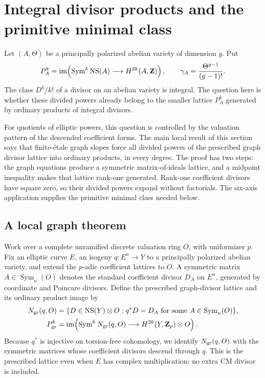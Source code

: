 \section{Integral divisor products and the primitive minimal class}
\label{sec:minimal-class}

Let \((A,\Theta)\) be a principally polarized abelian variety of dimension
\(g\).  Put
\[
 P_A^k=\operatorname{im}\!\left(
 \operatorname{Sym}^k\operatorname{NS}(A)\longrightarrow H^{2k}(A,\mathbf Z)
 \right),
 \qquad
 \gamma_A=\frac{\Theta^{g-1}}{(g-1)!}.
\]
The class \(D^k/k!\) of a divisor on an abelian variety is integral.  The
question here is whether these divided powers already belong to the smaller
lattice \(P_A^k\) generated by ordinary products of integral divisors.

For quotients of elliptic powers, this question is controlled by the
valuation pattern of the descended coefficient forms.  The main local result
of this section says that finite-\'etale graph slopes force all divided powers
of the prescribed graph divisor lattice into ordinary products, in every
degree.  The proof has two steps: the graph equations produce a symmetric
matrix-of-ideals lattice, and a midpoint inequality makes that lattice
rank-one generated.  Rank-one coefficient divisors have square zero, so their
divided powers expand without factorials.  The six-axis application supplies
the primitive minimal class needed below.

\subsection{A local graph theorem}

Work over a complete unramified discrete valuation ring \(O\), with
uniformizer \(p\).  Fix an elliptic curve \(E\), an isogeny
\(q:E^n\to Y\) to a principally polarized abelian variety, and extend the
\(p\)-adic coefficient lattices to \(O\).  A symmetric matrix
\(A\in\operatorname{Sym}_n(O)\) denotes the standard coefficient divisor
\(D_A\) on \(E^n\), generated by coordinate and Poincare divisors.  Define
the prescribed graph-divisor lattice and its ordinary product image by
\[
 \begin{aligned}
 N_{\rm gr}(q,O)
 &=\{D\in\operatorname{NS}(Y)\otimes O:q^*D=D_A
       \text{ for some }A\in\operatorname{Sym}_n(O)\},\\
 P_{\rm gr}^k
 &=\operatorname{im}\!\left(
   \operatorname{Sym}^kN_{\rm gr}(q,O)\longrightarrow
   H^{2k}(Y,\mathbf Z_p)\otimes O\right).
 \end{aligned}
\]
Because \(q^*\) is injective on torsion-free cohomology, we identify
\(N_{\rm gr}(q,O)\) with the symmetric matrices whose coefficient divisors
descend through \(q\).  This is the prescribed lattice even when \(E\) has
complex multiplication; no extra CM divisor is included.

